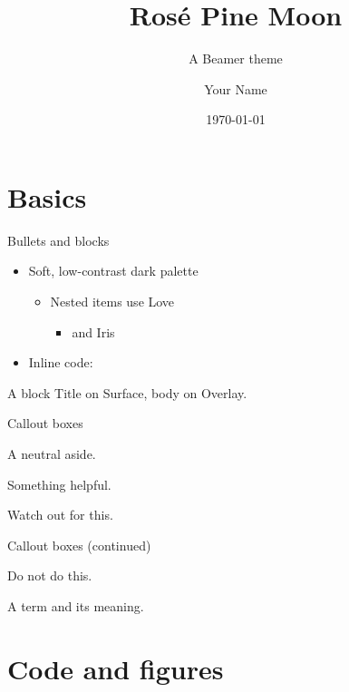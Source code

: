 \documentclass[aspectratio=169]{beamer}
\title{Rosé Pine Moon}
\subtitle{A Beamer theme}
\author{Your Name}
\date{\today}
\begin{document}
\maketitle

\section{Basics}

\begin{frame}{Bullets and blocks}
  \begin{itemize}
    \item Soft, low-contrast dark palette
    \begin{itemize}
      \item Nested items use Love
      \begin{itemize}\item and Iris\end{itemize}
    \end{itemize}
    \item Inline code: 
  \end{itemize}
  \begin{block}{A block}
    Title on Surface, body on Overlay.
  \end{block}
\end{frame}

\begin{frame}{Callout boxes}
  \begin{notebox}[Note] A neutral aside. \end{notebox}
  \begin{tip}[Tip] Something helpful. \end{tip}
  \begin{warning}[Warning] Watch out for this. \end{warning}
\end{frame}

\begin{frame}{Callout boxes (continued)}
  \begin{dangerbox}[Danger] Do not do this. \end{dangerbox}
  \begin{defbox}[Definition] A term and its meaning. \end{defbox}
\end{frame}

\section{Code and figures}
\end{document}
